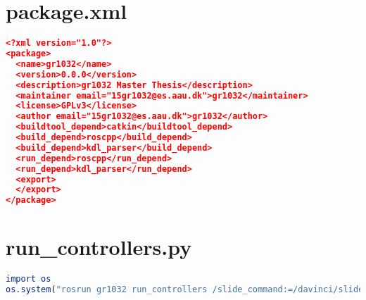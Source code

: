 \section*{package.xml}
\begin{lstlisting}[language=cmake]
<?xml version="1.0"?>
<package>
  <name>gr1032</name>
  <version>0.0.0</version>
  <description>gr1032 Master Thesis</description>
  <maintainer email="15gr1032@es.aau.dk">gr1032</maintainer>
  <license>GPLv3</license>
  <author email="15gr1032@es.aau.dk">gr1032</author>
  <buildtool_depend>catkin</buildtool_depend>
  <build_depend>roscpp</build_depend>
  <build_depend>kdl_parser</build_depend>
  <run_depend>roscpp</run_depend>
  <run_depend>kdl_parser</run_depend>
  <export>
  </export>
</package>
\end{lstlisting}
\section*{run\_controllers.py}
\begin{lstlisting}[language=cmake]
import os
os.system("rosrun gr1032 run_controllers /slide_command:=/davinci/slide_position_controller/command /pitch_command:=/davinci/hand_pitch_position_controller/command /roll_command:=/davinci/hand_roll_position_controller/command")
\end{lstlisting}
